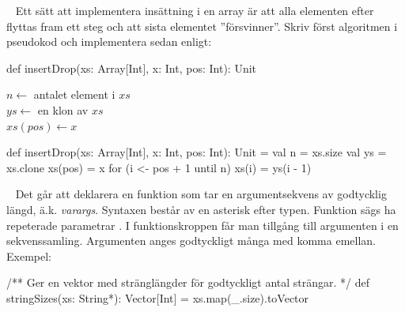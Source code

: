 \QUESTEND





\QUESTBEGIN

\Task  \what~  Ett sätt att implementera insättning i en array är att alla elementen efter  flyttas fram ett steg och att sista elementet ''försvinner''.
Skriv först algoritmen i pseudokod och implementera sedan enligt:
\begin{Code}
def insertDrop(xs: Array[Int], x: Int, pos: Int): Unit
\end{Code}

\SOLUTION

\TaskSolved \what

\begin{algorithm}[H]

 $n \leftarrow$ antalet element i $xs$\\
 $ys \leftarrow$ en klon av $xs$\\
 $xs(pos) \leftarrow x$\\
\end{algorithm}

\begin{Code}
def insertDrop(xs: Array[Int], x: Int, pos: Int): Unit = {
  val n = xs.size
  val ys = xs.clone
  xs(pos) = x
  for (i <- pos + 1 until n) xs(i) = ys(i - 1)
}
\end{Code}

\QUESTEND




\clearpage

\AdvancedTasks %




\QUESTBEGIN

\Task  \what~  Det går att deklarera en funktion som tar en argumentsekvens av godtycklig längd, ä.k. \emph{varargs}. Syntaxen består av en asterisk \code{*} efter typen. Funktion sägs ha repeterade parametrar . I funktionskroppen får man tillgång till argumenten i en sekvenssamling. Argumenten anges godtyckligt många med komma emellan. Exempel:
\begin{Code}
/** Ger en vektor med stränglängder för godtyckligt antal strängar. */
def stringSizes(xs: String*): Vector[Int] = xs.map(_.size).toVector
\end{Code}

